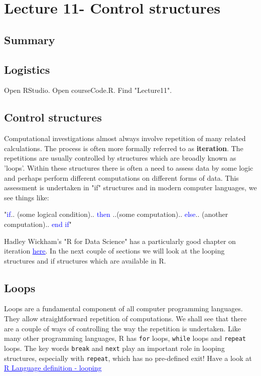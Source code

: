 \documentclass[titlepage]{book}\usepackage{knitr}
\begin{document}
\chapter{Lecture 11- Control structures}\label{L11}



\author{Brian Williams $<$\href{mailto:bjw649@gmail.com}%
{bjw649@gmail.com}$>$}


\section{Summary}

\section{Logistics}

Open RStudio. Open courseCode.R. Find "Lecture11".


\section{Control structures} 

Computational investigations almost always involve repetition of many related calculations.  The process is often more formally referred to as \textbf{iteration}. The repetitions are usually controlled by structures which are broadly known as 'loops'.  Within these structures there is often a need to assess data by some logic and perhaps perform different computations on different forms of data. This assessment is undertaken in "if" structures and in modern computer languages, we see things like:

"\textcolor{blue}{if}.. (some logical condition)..  \textcolor{blue}{then} ..(some computation).. \textcolor{blue}{else}.. (another computation)..  \textcolor{blue}{end if}"

Hadley Wickham's "R for Data Science" has a particularly good chapter on iteration \href{https://r4ds.had.co.nz/iteration.html}{\textcolor{blue}{\underline{here}}}. 
In the next couple of sections we will look at the looping structures and if structures which are available in R.

\section{Loops}\label{L11loops}
Loops are a fundamental component of all computer programming languages.  They allow straightforward repetition of computations.  We shall see that there are a couple of ways of controlling the way the repetition is undertaken. Like many other programming languages, R has \texttt{for} loops, \texttt{while} loops and \texttt{repeat} loops. The key words \texttt{break} and \texttt{next} play an important role in looping structures, especially with \texttt{repeat}, which has no pre-defined exit! Have a look at \href{https://cran.r-project.org/doc/manuals/r-release/R-lang.html#Looping}{\textcolor{blue}{\underline{R Language definition - looping}}}
\end{document}
